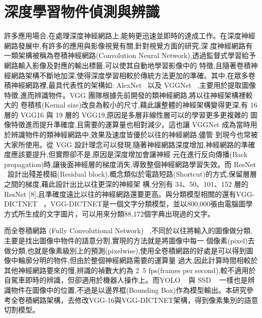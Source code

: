\section{深度學習物件偵測與辨識}
許多應用場合,在處理深度神經網路上,能夠更迅速並即時的達成工作。在深度神經網路發展中,有許多的應用與影像視覺有關,針對視覺方面的研究,深
度神經網路有一類架構被稱為卷積神經網路(Convolution Neural Network),透過監督式學習給予網路輸入影像及對應的輸出標籤,可以使其自動地學習影像中的
特徵,且隨著卷積神經網路架構不斷地加深,使得深度學習相較於傳統方法更加的準確。其中,在眾多卷積神經網路裡,最具代表性的架構如: AlexNet ~\cite{krizhevsky2012imagenet}以及 VGGNet ~\cite{simonyan2014very},主要用於提取圖像特徵,進而辨識物件。VGG 團隊根據先前開發的類神經網路,將以往神經架構裡較大的
卷積核(Kernal size)改良為較小的尺寸,藉此讓整體的神經架構變得更深,有 16層的 VGG16 與 19 層的 VGG19,原因是多層非線性層可以的學習更多更複雜的
圖像特徵進而提升準確度,且需要的運算量也相對減少。這也讓 VGGNet 成為當時用於辨識物件的類神經網路中,效果及速度皆優於以往的神經網路,儘管
到現今也常被大家所使用。從 VGG 設計理念可以發現,隨著神經網路深度增加,神經網路的準確度應該要提升,但實際卻不是,原因是深度增加會讓神經
元在進行反向傳播(Back propagation)時,讓後面神經層的梯度消失,導致整個神經網路學習失效。而 ResNet ~\cite{he2016deep}設計出殘差模組(Residual block),概念類似於電路短路(Shortcut)的方式,保留層層之間的梯度,藉此設計出比以往更深的神經架
構,分別有 34、50、101、152 層的 ResNet [8],且準確度遠比以往的神經網路還要更高。與分類模型相關的還有VGG-DICTNET ~\cite{jaderberg2014deep
}，VGG-DICTNET是一個文字分類模型，並以800,000張由電腦圖學方式所生成的文字圖片，可以用來分類88,172個字典出現過的文字。

而全卷積網路 (Fully Convolutional Network) ~\cite{long2015fully},不同於以往將輸入的圖像做分類,主要是找出圖像中物件的語意分割,實現的方法就是將圖像中每一
個像素(pixel)去做分類,也就是像素級別上的預測(pixelwise),使用全卷積網路的好處是可以得到圖像中輪廓分明的物件,但由於整個神經網路需要的運算量
過大,因此計算時間相較於其他神經網路要來的慢,辨識的禎數大約為 2~5 fps(frames per second),較不適用於自駕車即時的辨識，但卻適用於機器人操作上。而YOLO ~\cite{redmon2017yolo9000} 與 SSD ~\cite{liu2016ssd} 一樣也是辨識物件在圖像中的位置,不過是以邊界框(Bounding Box)作為模型輸出。本研究參考全卷積網路架構，去修改VGG-16與VGG-DICTNET架構，得到像素集別的語意切割模型。

